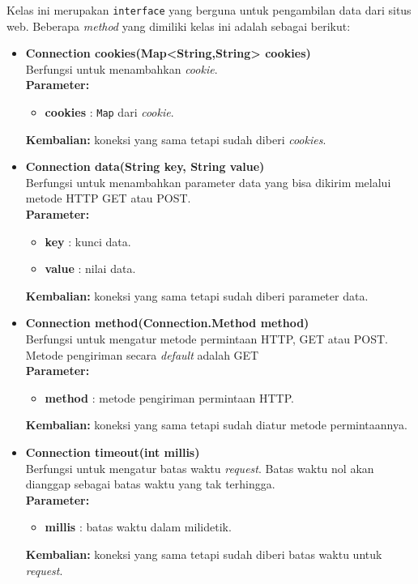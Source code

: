 Kelas ini merupakan \texttt{interface} yang berguna untuk pengambilan data dari situs web. Beberapa \textit{method} yang dimiliki kelas ini adalah sebagai berikut:

\begin{itemize}
	\item \textbf{Connection cookies(Map<String,String> cookies)} \\
		Berfungsi untuk menambahkan \textit{cookie}. \\
		\textbf{Parameter:}
		\begin{itemize}
			\item \textbf{cookies} : \texttt{Map} dari \textit{cookie}.
		\end{itemize}
		\textbf{Kembalian:} koneksi yang sama tetapi sudah diberi \textit{cookies}.
		
		\item \textbf{Connection data(String key, String value)} \\
		Berfungsi untuk menambahkan parameter data yang bisa dikirim melalui metode HTTP GET atau POST. \\
		\textbf{Parameter:}
		\begin{itemize}
			\item \textbf{key} : kunci data.
			\item \textbf{value} : nilai data.
		\end{itemize}
		\textbf{Kembalian:} koneksi yang sama tetapi sudah diberi parameter data.
		
		\item \textbf{Connection method(Connection.Method method)} \\
		Berfungsi untuk mengatur metode permintaan HTTP, GET atau POST. Metode pengiriman secara \textit{default} adalah GET\\
		\textbf{Parameter:}
		\begin{itemize}
			\item \textbf{method} : metode pengiriman permintaan HTTP.
		\end{itemize}
		\textbf{Kembalian:} koneksi yang sama tetapi sudah diatur metode permintaannya.
		
		\item \textbf{Connection timeout(int millis)} \\
		Berfungsi untuk mengatur batas waktu \textit{request}. Batas waktu nol akan dianggap sebagai batas waktu yang tak terhingga. \\
		\textbf{Parameter:}
		\begin{itemize}
			\item \textbf{millis} : batas waktu dalam milidetik.
		\end{itemize}
		\textbf{Kembalian:} koneksi yang sama tetapi sudah diberi batas waktu untuk \textit{request}.
		

\end{itemize}
